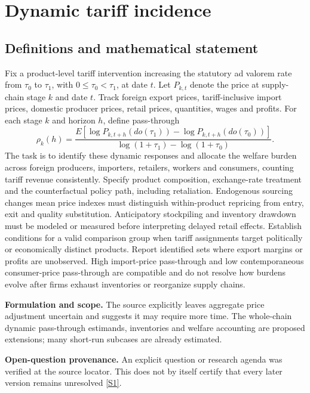 \documentclass[11pt]{article}
\newcommand{\sref}[2]{\hyperlink{source:#1:#2}{[S#2]}}
\begin{document}
\section*{Dynamic tariff incidence}\label{30007624}
\subsection{Definitions and mathematical statement}
Fix a product-level tariff intervention increasing the statutory ad valorem rate from \(\tau_0\) to \(\tau_1\), with \(0\leq\tau_0<\tau_1\), at date \(t\). Let \(P_{k,t}\) denote the price at supply-chain stage \(k\) and date \(t\). Track foreign export prices, tariff-inclusive import prices, domestic producer prices, retail prices, quantities, wages and profits. For each stage \(k\) and horizon \(h\), define pass-through
\[\rho_k(h)=\frac{E[\log P_{k,t+h}(do(\tau_1))-\log P_{k,t+h}(do(\tau_0))]}{\log(1+\tau_1)-\log(1+\tau_0)}.\]
The task is to identify these dynamic responses and allocate the welfare burden across foreign producers, importers, retailers, workers and consumers, counting tariff revenue consistently. Specify product composition, exchange-rate treatment and the counterfactual policy path, including retaliation. Endogenous sourcing changes mean price indexes must distinguish within-product repricing from entry, exit and quality substitution. Anticipatory stockpiling and inventory drawdown must be modeled or measured before interpreting delayed retail effects. Establish conditions for a valid comparison group when tariff assignments target politically or economically distinct products. Report identified sets where export margins or profits are unobserved. High import-price pass-through and low contemporaneous consumer-price pass-through are compatible and do not resolve how burdens evolve after firms exhaust inventories or reorganize supply chains.

\par\textbf{Formulation and scope.} The source explicitly leaves aggregate price adjustment uncertain and suggests it may require more time. The whole-chain dynamic pass-through estimands, inventories and welfare accounting are proposed extensions; many short-run subcases are already estimated.

\par\textbf{Open-question provenance.} An explicit question or research agenda was verified at the source locator. This does not by itself certify that every later version remains unresolved \sref{30007624}{1}.
\end{document}
